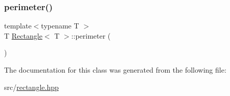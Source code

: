 \mbox{\label{classRectangle_a9c59dcb7376296711ad86e2da924d3c8}} 
\subsubsection{\texorpdfstring{perimeter()}{perimeter()}}
{\footnotesize\ttfamily template$<$typename T $>$ \\
T \mbox{\hyperlink{classRectangle}{Rectangle}}$<$ T $>$\+::perimeter (\begin{DoxyParamCaption}{ }\end{DoxyParamCaption})}



The documentation for this class was generated from the following file\+:\begin{DoxyCompactItemize}
\item 
src/\mbox{\hyperlink{rectangle_8hpp}{rectangle.\+hpp}}\end{DoxyCompactItemize}
